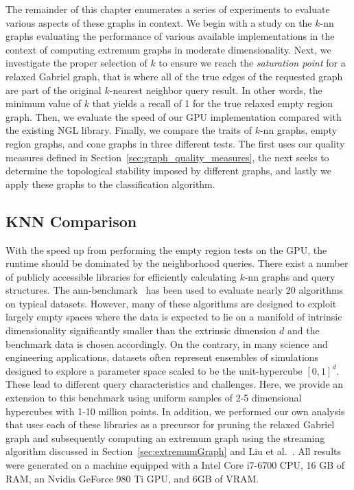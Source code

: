 The remainder of this chapter enumerates a series of experiments to evaluate various aspects of these graphs in context.
%
We begin with a study on the $k$-nn graphs evaluating the performance of various available implementations in the context of computing extremum graphs in moderate dimensionality.
%
Next, we investigate the proper selection of $k$ to ensure we reach the \textit{saturation point} for a relaxed Gabriel graph, that is where all of the true edges of the requested graph are part of the original $k$-nearest neighbor query result.
%
In other words, the minimum value of $k$ that yields a recall of 1 for the true relaxed empty region graph.
%
Then, we evaluate the speed of our GPU implementation compared with the existing NGL library.
%
Finally, we compare the traits of $k$-nn graphs, empty region graphs, and cone graphs in three different tests.
%
The first uses our quality measures defined in Section~\ref{sec:graph_quality_measures}, the next seeks to determine the topological stability imposed by different graphs, and lastly we apply these graphs to the classification algorithm.

\subsection{KNN Comparison}
\label{sec:knn_benchmark}

With the speed up from performing the empty region tests on the GPU, the runtime should be dominated by the neighborhood queries.
%
There exist a number of publicly accessible libraries for efficiently calculating $k$-nn graphs and query structures.
%
The ann-benchmark~\cite{AumullerBernhardssonFaithfull2018} has been used to evaluate nearly 20 algorithms on typical datasets.
%
However, many of these algorithms are designed to exploit largely empty spaces where the data is expected to lie on a manifold of intrinsic dimensionality significantly smaller than the extrinsic dimension $d$ and the benchmark data is chosen accordingly.
%
On the contrary, in many science and engineering applications, datasets often represent ensembles of simulations designed to explore a parameter space scaled to be the unit-hypercube $[0,1]^d$.
%
These lead to different query characteristics and challenges.
%
Here, we provide an extension to this benchmark using uniform samples of 2-5 dimensional hypercubes with 1-10 million points.
%
In addition, we performed our own analysis that uses each of these libraries as a precursor for pruning the relaxed Gabriel graph and subsequently computing an extremum graph using the streaming algorithm discussed in Section~\ref{sec:extremumGraph} and Liu et al.~\cite{LiuWangMaljovec2019}.
%
All results were generated on a machine equipped with a Intel Core i7-6700 CPU, 16 GB of RAM, an Nvidia GeForce 980 Ti GPU, and 6GB of VRAM.

